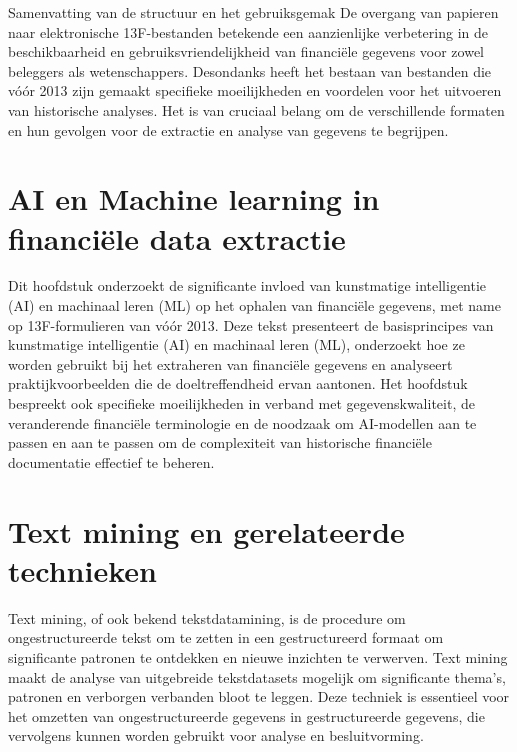 Samenvatting van de structuur en het gebruiksgemak
De overgang van papieren naar elektronische 13F-bestanden betekende een aanzienlijke verbetering in de beschikbaarheid en gebruiksvriendelijkheid van financiële gegevens voor zowel beleggers als wetenschappers. Desondanks heeft het bestaan van bestanden die vóór 2013 zijn gemaakt specifieke moeilijkheden en voordelen voor het uitvoeren van historische analyses. Het is van cruciaal belang om de verschillende formaten en hun gevolgen voor de extractie en analyse van gegevens te begrijpen.






\section{AI en Machine learning in financiële data extractie}
Dit hoofdstuk onderzoekt de significante invloed van kunstmatige intelligentie (AI) en machinaal leren (ML) op het ophalen van financiële gegevens, met name op 13F-formulieren van vóór 2013. Deze tekst presenteert de basisprincipes van kunstmatige intelligentie (AI) en machinaal leren (ML), onderzoekt hoe ze worden gebruikt bij het extraheren van financiële gegevens en analyseert praktijkvoorbeelden die de doeltreffendheid ervan aantonen. Het hoofdstuk bespreekt ook specifieke moeilijkheden in verband met gegevenskwaliteit, de veranderende financiële terminologie en de noodzaak om AI-modellen aan te passen en aan te passen om de complexiteit van historische financiële documentatie effectief te beheren.


\section{Text mining en gerelateerde technieken}
Text mining, of ook bekend tekstdatamining, is de procedure om ongestructureerde tekst om te zetten in een gestructureerd formaat om significante patronen te ontdekken en nieuwe inzichten te verwerven. Text mining maakt de analyse van uitgebreide tekstdatasets mogelijk om significante thema's, patronen en verborgen verbanden bloot te leggen. Deze techniek is essentieel voor het omzetten van ongestructureerde gegevens in gestructureerde gegevens, die vervolgens kunnen worden gebruikt voor analyse en besluitvorming\autocite{IBM2024}.

